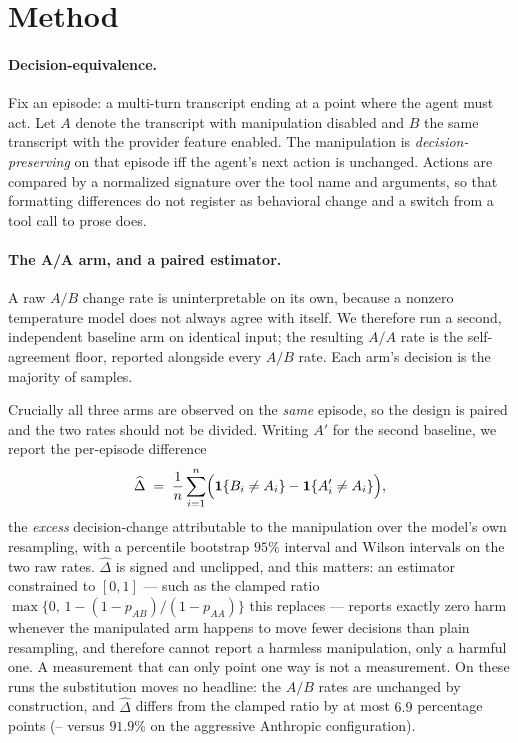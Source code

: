 \documentclass[11pt]{article}
\newcommand{\pcAnthropicAggressiveExcess}{--}\newcommand{\pcAnthropicAggressiveExcessCI}{--}%
\begin{document}
\section{Method}
\label{sec:method}

\paragraph{Decision-equivalence.}
Fix an episode: a multi-turn transcript ending at a point where the agent must act.
Let $A$ denote the transcript with manipulation disabled and $B$ the same
transcript with the provider feature enabled. The manipulation is
\emph{decision-preserving} on that episode iff the agent's next action is
unchanged. Actions are compared by a normalized signature over the tool name and
arguments, so that formatting differences do not register as behavioral change and
a switch from a tool call to prose does.

\paragraph{The A/A arm, and a paired estimator.}
A raw $A/B$ change rate is uninterpretable on its own, because a nonzero
temperature model does not always agree with itself. We therefore run a second,
independent baseline arm on identical input; the resulting $A/A$ rate is the
self-agreement floor, reported alongside every $A/B$ rate. Each arm's decision is
the majority of \pcVotes{} samples.

Crucially all three arms are observed on the \emph{same} episode, so the design is
paired and the two rates should not be divided. Writing $A'$ for the second
baseline, we report the per-episode difference
\[
  \widehat{\Delta} \;=\; \frac{1}{n}\sum_{i=1}^{n}
  \Bigl( \mathbf{1}\{B_i \neq A_i\} - \mathbf{1}\{A'_i \neq A_i\} \Bigr),
\]
the \emph{excess} decision-change attributable to the manipulation over the
model's own resampling, with a percentile bootstrap $95\%$ interval and Wilson
intervals on the two raw rates. $\widehat{\Delta}$ is signed and unclipped, and
this matters: an estimator constrained to $[0,1]$ --- such as the clamped ratio
$\max\{0,\,1-(1-p_{AB})/(1-p_{AA})\}$ this replaces --- reports exactly zero harm
whenever the manipulated arm happens to move fewer decisions than plain
resampling, and therefore cannot report a harmless manipulation, only a harmful
one. A measurement that can only point one way is not a measurement. On these
runs the substitution moves no headline: the $A/B$ rates are unchanged by
construction, and $\widehat{\Delta}$ differs from the clamped ratio by at most
$6.9$ percentage points (\pcAnthropicAggressiveExcess{} versus $91.9\%$ on the
aggressive Anthropic configuration).
\end{document}
